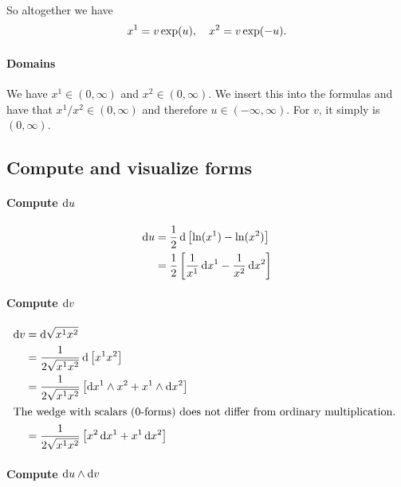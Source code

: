 \documentclass[11pt, english, fleqn, DIV=15, headinclude, BCOR=1cm]{scrartcl}
\begin{document}
So altogether we have
\[
    x^1 = v \exp(u)
    ,\quad
    x^2 = v \exp(-u).
\]

\paragraph{Domains}

We have $x^1 \in (0, \infty)$ and $x^2 \in (0, \infty)$. We insert this into the
formulas and have that $x^1/x^2 \in (0, \infty)$ and therefore $u \in (-\infty,
\infty)$. For $v$, it simply is $(0, \infty)$.

\subsection{Compute and visualize forms}

\paragraph{Compute $\mathop{}\!\mathrm d u$}

\begin{align*}
    \mathop{}\!\mathrm d u
    &= \frac12 \mathop{}\!\mathrm d \left[ \ln(x^1) - \ln(x^2) \right] \\
    &= \frac12 \left[ \frac{1}{x^1} \mathop{}\!\mathrm d x^1 - \frac{1}{x^2} \mathop{}\!\mathrm d x^2 \right]
\end{align*}

\paragraph{Compute $\mathop{}\!\mathrm d v$}

\begin{align*}
    \dif v
    &= \dif \sqrt{x^1 x^2} \\
    &= \frac{1}{2 \sqrt{x^1 x^2}} \dif \sbr{x^1 x^2} \\
    &= \frac{1}{2 \sqrt{x^1 x^2}} \sbr{\dif x^1 \wedge x^2 + x^1 \wedge \dif x^2} \\
    \intertext{%
        The wedge with scalars (0-forms) does not differ from ordinary
        multiplication.
    }
    &= \frac{1}{2 \sqrt{x^1 x^2}} \sbr{x^2 \dif x^1 + x^1 \dif x^2}
\end{align*}

\paragraph{Compute $\mathop{}\!\mathrm d u \wedge \mathop{}\!\mathrm d v$}
\end{document}
